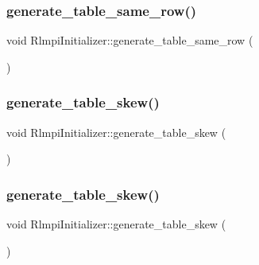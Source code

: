 \subsubsection{\texorpdfstring{generate\_table\_same\_row()}{generate\_table\_same\_row()}\hspace{0.1cm}{\footnotesize\ttfamily [2/2]}}
{\footnotesize\ttfamily void Rlmpi\+Initializer\+::generate\+\_\+table\+\_\+same\+\_\+row (\begin{DoxyParamCaption}{ }\end{DoxyParamCaption})\hspace{0.3cm}{\ttfamily [protected]}}

\mbox{\label{classRlmpiInitializer_a2a7ecc728bf06dc067eff4ee840c75d5}} 
\subsubsection{\texorpdfstring{generate\_table\_skew()}{generate\_table\_skew()}\hspace{0.1cm}{\footnotesize\ttfamily [1/2]}}
{\footnotesize\ttfamily void Rlmpi\+Initializer\+::generate\+\_\+table\+\_\+skew (\begin{DoxyParamCaption}{ }\end{DoxyParamCaption})\hspace{0.3cm}{\ttfamily [protected]}}

\mbox{\label{classRlmpiInitializer_a2a7ecc728bf06dc067eff4ee840c75d5}} 
\subsubsection{\texorpdfstring{generate\_table\_skew()}{generate\_table\_skew()}\hspace{0.1cm}{\footnotesize\ttfamily [2/2]}}
{\footnotesize\ttfamily void Rlmpi\+Initializer\+::generate\+\_\+table\+\_\+skew (\begin{DoxyParamCaption}{ }\end{DoxyParamCaption})\hspace{0.3cm}{\ttfamily [protected]}}

